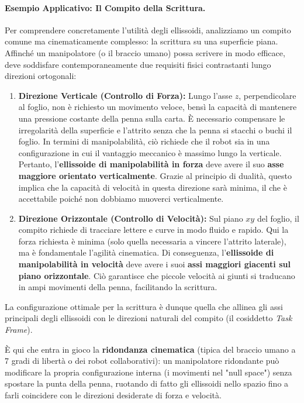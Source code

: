 ﻿\documentclass[11pt, a4paper]{article}
\begin{document}
\newpage
\paragraph{Esempio Applicativo: Il Compito della Scrittura.}

Per comprendere concretamente l'utilità degli ellissoidi, analizziamo un compito comune ma cinematicamente complesso: la scrittura su una superficie piana. Affinché un manipolatore (o il braccio umano) possa scrivere in modo efficace, deve soddisfare contemporaneamente due requisiti fisici contrastanti lungo direzioni ortogonali:

\begin{enumerate}
    \item \textbf{Direzione Verticale (Controllo di Forza):}
    Lungo l'asse $z$, perpendicolare al foglio, non è richiesto un movimento veloce, bensì la capacità di mantenere una pressione costante della penna sulla carta. È necessario compensare le irregolarità della superficie e l'attrito senza che la penna si stacchi o buchi il foglio.
    In termini di manipolabilità, ciò richiede che il robot sia in una configurazione in cui il vantaggio meccanico è massimo lungo la verticale. Pertanto, l'\textbf{ellissoide di manipolabilità in forza} deve avere il suo \textbf{asse maggiore orientato verticalmente}. Grazie al principio di dualità, questo implica che la capacità di velocità in questa direzione sarà minima, il che è accettabile poiché non dobbiamo muoverci verticalmente.

    \item \textbf{Direzione Orizzontale (Controllo di Velocità):}
    Sul piano $xy$ del foglio, il compito richiede di tracciare lettere e curve in modo fluido e rapido. Qui la forza richiesta è minima (solo quella necessaria a vincere l'attrito laterale), ma è fondamentale l'agilità cinematica.
    Di conseguenza, l'\textbf{ellissoide di manipolabilità in velocità} deve avere i suoi \textbf{assi maggiori giacenti sul piano orizzontale}. Ciò garantisce che piccole velocità ai giunti si traducano in ampi movimenti della penna, facilitando la scrittura.
\end{enumerate}

La configurazione ottimale per la scrittura è dunque quella che allinea gli assi principali degli ellissoidi con le direzioni naturali del compito (il cosiddetto \emph{Task Frame}).

È qui che entra in gioco la \textbf{ridondanza cinematica} (tipica del braccio umano a 7 gradi di libertà o dei robot collaborativi): un manipolatore ridondante può modificare la propria configurazione interna (i movimenti nel "null space") senza spostare la punta della penna, ruotando di fatto gli ellissoidi nello spazio fino a farli coincidere con le direzioni desiderate di forza e velocità.
\end{document}
